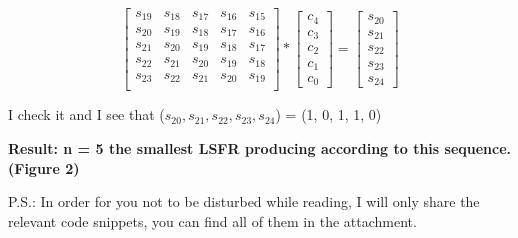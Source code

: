 \documentclass[a4paper, 11pt]{article}
\begin{document}
\begin{center}
  \begin{equation*}
     \begin{bmatrix}
      s_{19} & s_{18} & s_{17} & s_{16} & s_{15}\\
      s_{20} & s_{19} & s_{18} & s_{17} & s_{16}\\
      s_{21} & s_{20} & s_{19} & s_{18} & s_{17}\\
      s_{22} & s_{21} & s_{20} & s_{19} & s_{18}\\
      s_{23} & s_{22} & s_{21} & s_{20} & s_{19}\\
    \end{bmatrix} 
    *
    \begin{bmatrix}
      c_{4}\\  c_{3}\\  c_{2}\\ c_{1}\\  c_{0}
    \end{bmatrix}
    =
    \begin{bmatrix}
      s_{20}\\  s_{21}\\  s_{22}\\ s_{23}\\  s_{24}
    \end{bmatrix}
  \end{equation*}
\end{center}

I check it and I see that ($s_{20} , s_{21}, s_{22}, s_{23}, s_{24}$) = (1, 0, 1, 1, 0)\singlespacing


\noindent\textbf{Result: n = 5 the smallest LSFR producing according to this sequence.(Figure 2)}\singlespacing

\singlespacing\noindent P.S.: In order for you not to be disturbed while reading, I will only share the relevant code snippets, you can find all of them in the attachment.
\end{document}
